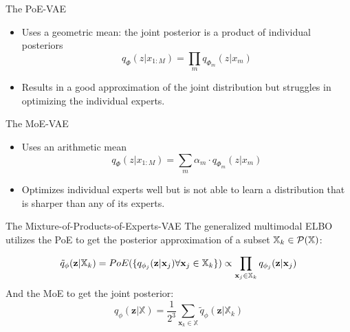             \begin{frame}{The PoE-VAE}

                \begin{itemize}
                    \item Uses a geometric mean: the joint posterior is a product of individual posteriors
                \begin{equation}
                    q_{\Phi}(z|x_{1:M})=\prod _m q_{\Phi_m}(z|x_m)
                \end{equation}
                    \item Results in a good approximation of the joint distribution but struggles in optimizing the individual experts.
                \end{itemize}

            \end{frame}

            \begin{frame}{The MoE-VAE}
            \begin{itemize}
                \item Uses an arithmetic mean
                \begin{equation}
                    q_{\Phi}(z|x_{1:M})=\sum _m \alpha_m\cdot q_{\Phi_m}(z|x_m)
                \end{equation}
                \item Optimizes individual experts well but is not able to learn a distribution that is sharper than any of its experts.
            \end{itemize}

            \end{frame}

            \begin{frame}{The Mixture-of-Products-of-Experts-VAE}
                The generalized multimodal ELBO utilizes the PoE to get the posterior approximation of a subset $\mathbb{X}_k \in \mathcal{P}(\mathbb{X})$:

				\begin{equation}
					\tilde{q}_{\phi}(\textbf{z}|\mathbb{X}_k)=PoE(\{q_{\phi_j}(\textbf{z}|\textbf{x}_j) \forall \textbf{x}_j \in \mathbb{X}_k\}) \propto \prod _{\textbf{x}_j \in \mathbb{X}_k}q_{\phi_j}(\textbf{z}|\textbf{x}_j)
				\end{equation}
				And the MoE to get the joint posterior:
				\begin{equation}
					q_{\phi}(\textbf{z}|\mathbb{X}) = \frac{1}{2^3} \sum _{\textbf{x}_k \in \mathbb{X}} \tilde{q}_{\phi} (\textbf{z}|\mathbb{X}_k)
				\end{equation}
            \end{frame}

